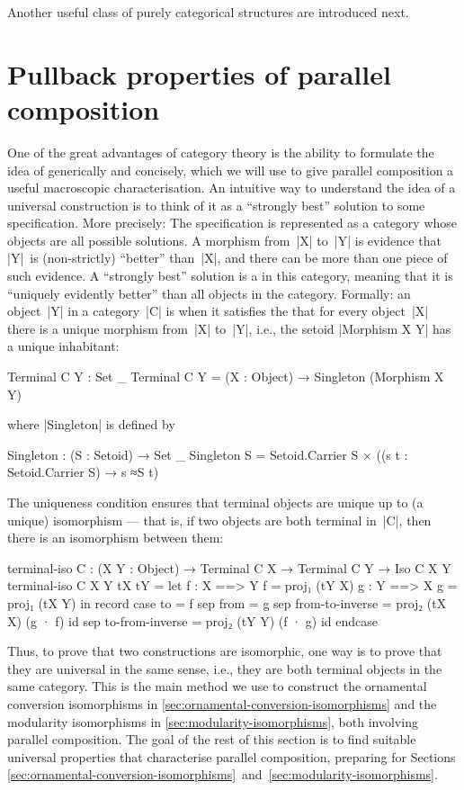 Another useful class of purely categorical structures are introduced next.

\section{Pullback properties of parallel composition}
\label{sec:parallel-composition-pullback}

One of the great advantages of category theory is the ability to formulate the idea of  generically and concisely, which we will use to give parallel composition a useful macroscopic characterisation.
An intuitive way to understand the idea of a universal construction is to think of it as a ``strongly best'' solution to some specification.
More precisely:
The specification is represented as a category whose objects are all possible solutions.
A morphism from~|X| to~|Y| is evidence that |Y|~is (non-strictly) ``better'' than~|X|, and there can be more than one piece of such evidence.
A ``strongly best'' solution is a  in this category, meaning that it is ``uniquely evidently better'' than all objects in the category.
Formally: an object~|Y| in a category~|C| is  when it satisfies the  that for every object~|X| there is a unique morphism from~|X| to~|Y|, i.e., the setoid |Morphism X Y| has a unique inhabitant:
\begin{code}
Terminal C Y : Set _
Terminal C Y = (X : Object) → Singleton (Morphism X Y)
\end{code}
where |Singleton| is defined by
\begin{code}
Singleton : (S : Setoid) → Set _
Singleton S = Setoid.Carrier S × ((s t : Setoid.Carrier S) → s ≈S t)
\end{code}
The uniqueness condition ensures that terminal objects are unique up to (a unique) isomorphism --- that is, if two objects are both terminal in~|C|, then there is an isomorphism between them:
\begin{code}
terminal-iso C : (X Y : Object) → Terminal C X → Terminal C Y → Iso C X Y
terminal-iso C X Y tX tY =
  let  f : X ==> Y
       f = proj₁ (tY  X)
       g : Y ==> X
       g = proj₁ (tX  Y)
  in   record  case  to    = f
               sep   from  = g
               sep   from-to-inverse  = proj₂ (tX  X)  (g · f) id
               sep   to-from-inverse  = proj₂ (tY  Y)  (f · g) id endcase
\end{code}
Thus, to prove that two constructions are isomorphic, one way is to prove that they are universal in the same sense, i.e., they are both terminal objects in the same category.
This is the main method we use to construct the ornamental conversion isomorphisms in \autoref{sec:ornamental-conversion-isomorphisms} and the modularity isomorphisms in \autoref{sec:modularity-isomorphisms}, both involving parallel composition.
The goal of the rest of this section is to find suitable universal properties that characterise parallel composition, preparing for Sections \ref{sec:ornamental-conversion-isomorphisms}~and~\ref{sec:modularity-isomorphisms}.

